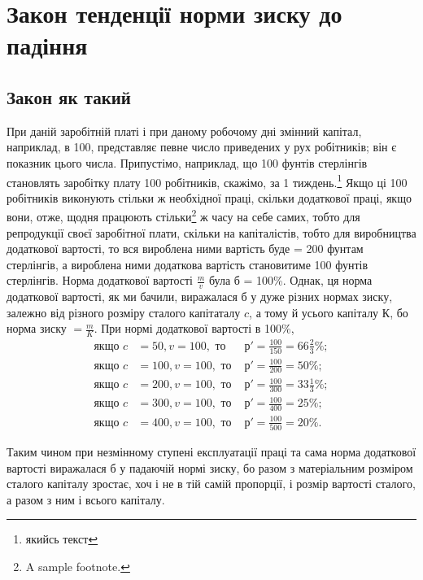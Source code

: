 \documentclass[12pt, a4paper, final]{memoir}
\begin{document}
\chapter{Закон тенденції норми зиску до падіння}
\section{Закон як такий}
При даній заробітній платі і при даному робочому дні змінний капітал, наприклад, в 100, представляє певне число приведених у рух робітників; він є показник цього числа. Припустімо, наприклад, що 100 фунтів стерлінгів становлять заробітку плату 100 робітників, скажімо, за 1 тиждень.\footnote{якийсь текст} Якщо ці 100 робітників виконують стільки ж необхідної праці, скільки додаткової праці, якщо вони, отже, щодня працюють стільки\footnote{A sample\footnotemark{} footnote.} ж часу на себе самих, тобто для репродукції своєї заробітної плати, скільки на капіталістів, тобто для виробництва додаткової вартості, то вся вироблена ними вартість буде = 200 фунтам стерлінгів, а вироблена ними додаткова вартість становитиме 100 фунтів стерлінгів. Норма додаткової вартості $\frac{m}{v}$ була б = 100\%. Однак, ця норма додаткової вартості, як ми бачили, виражалася б у дуже різних нормах зиску, залежно від різного розміру сталого капітаталу $c$, а тому й усього капіталу $К$, бо норма зиску $=\frac{m}{K}$. При нормі додаткової вартості в 100\%,
\begin{align*}
\text{якщо } c&=50, v=100, \text{ то } & р'=\frac{100}{150}=66\frac{2}{3}\%;\\
\text{якщо } c&=100, v=100, \text{ то } &  р'=\frac{100}{200}=50\%;\\
\text{якщо } c&=200, v=100, \text{ то } & р'=\frac{100}{300}=33\frac{1}{3}\%;\\
\text{якщо } c&=300, v=100, \text{ то } & р'=\frac{100}{400}=25\%;\\
\text{якщо } c&=400, v=100, \text{ то } & р'=\frac{100}{500}=20\%.
\end{align*}

Таким чином при незмінному ступені експлуатації праці та сама норма додаткової вартості виражалася б у падаючій нормі зиску, бо разом з матеріальним розміром сталого капіталу зростає, хоч і не в тій самій пропорції, і розмір вартості сталого, а разом з ним і всього капіталу.
\end{document}
